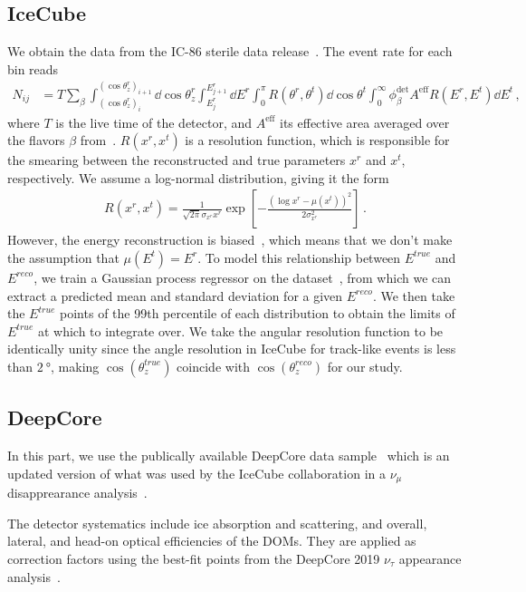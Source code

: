 \documentclass[draft=True]{revtex4-2}
\newcommand{\zreco}{\ensuremath{\cos{(\theta_z^{reco})}}}
\newcommand{\ztrue}{\ensuremath{\cos{(\theta_z^{true})}}}
\newcommand{\Ereco}{E^{reco}}
\newcommand{\Etrue}{E^{true}}
\begin{document}
\subsection{IceCube}\label{ch:ICmethod}
We obtain the data from the IC-86 sterile data release~\cite{IC2020}. The event rate for each bin reads
\begin{align}\label{eq:ICevents}
   N_{ij} &= T\sum_\beta \int_{(\cos{\theta_z^r})_i}^{(\cos{\theta_z^r})_{i+1}} \dd \cos{\theta^r_z} \int_{E^r_{j}}^{E^r_{j+1}} \dd E^r \int_0^\pi R(\theta^r,\theta^t) \dd \cos{\theta^t} \int_0^\infty \phi_\beta^\text{det}  A^\text{eff} R(E^r,E^t) 
   \dd E^t\,,
\end{align}
where $T$ is the live time of the detector, and $A^\text{eff}$ its effective area averaged over the flavors $\beta$ from~\cite{ICaeff}. $R(x^r,x^t)$ is a resolution function, 
which is responsible for the smearing between the reconstructed and true parameters $x^r$ and $x^t$, respectively. We assume a log-normal distribution, giving it the form 
\begin{align}
    R(x^r, x^t) = \frac{1}{\sqrt{2\pi} \sigma_{x^r}x^r} \exp\left[-\frac{(\log x^r-\mu(x^t))^2}{2\sigma_{x^r}^2}\right]\,.
\end{align}
However, the energy reconstruction is biased~\cite{weaverEvidenceAstrophysicalMuon}, which means that we don't make the assumption that $\mu(E^t) =E^r$. To model this relationship between $\Etrue$ and $\Ereco$, we train a Gaussian process regressor on the dataset~\cite{IC2016}, from which
we can extract a predicted mean and standard deviation for a given $E^{reco}$. We then take the $\Etrue$ points of the 99th percentile of each distribution to obtain
the limits of $\Etrue$ at which to integrate over. We take the angular resolution function to be identically unity since the angle resolution in IceCube for track-like events is less than $\SI{2}{\degree}$, making $\ztrue$ coincide with $\zreco$ for our study. 

\subsection{DeepCore}\label{ch:DCmethod}
In this part, we use the publically available DeepCore data sample~\cite{DC2019data} which is an updated version of what was used by the 
IceCube collaboration in a $\nu_\mu$ disapprearance analysis~\cite{DC2018mudisappearance}.

The detector systematics include ice absorption and scattering, and overall, lateral, and head-on optical efficiencies of the DOMs. 
They are applied as correction factors using the best-fit points from the DeepCore 2019 $\nu_\tau$ appearance 
analysis~\cite{DC2019tauappearance}.
\end{document}
